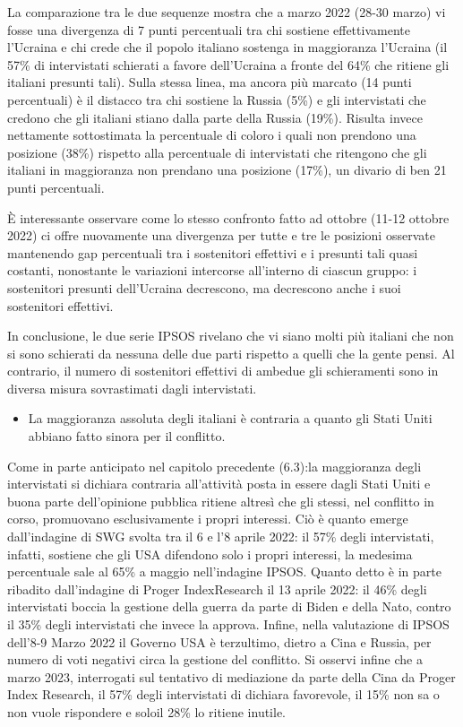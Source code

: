 \documentclass[
  openany]{book}
\providecommand{\tightlist}{%
  \setlength{\itemsep}{0pt}\setlength{\parskip}{0pt}}
\begin{document}
La comparazione tra le due sequenze mostra che a marzo 2022 (28-30 marzo) vi fosse una divergenza di 7 punti percentuali tra chi sostiene effettivamente l'Ucraina e chi crede che il popolo italiano sostenga in maggioranza l'Ucraina (il 57\% di intervistati schierati a favore dell'Ucraina a fronte del 64\% che ritiene gli italiani presunti tali). Sulla stessa linea, ma ancora più marcato (14 punti percentuali) è il distacco tra chi sostiene la Russia (5\%) e gli intervistati che credono che gli italiani stiano dalla parte della Russia (19\%). Risulta invece nettamente sottostimata la percentuale di coloro i quali non prendono una posizione (38\%) rispetto alla percentuale di intervistati che ritengono che gli italiani in maggioranza non prendano una posizione (17\%), un divario di ben 21 punti percentuali.

È interessante osservare come lo stesso confronto fatto ad ottobre (11-12 ottobre 2022) ci offre nuovamente una divergenza per tutte e tre le posizioni osservate mantenendo gap percentuali tra i sostenitori effettivi e i presunti tali quasi costanti, nonostante le variazioni intercorse all'interno di ciascun gruppo: i sostenitori presunti dell'Ucraina decrescono, ma decrescono anche i suoi sostenitori effettivi.

In conclusione, le due serie IPSOS rivelano che vi siano molti più italiani che non si sono schierati da nessuna delle due parti rispetto a quelli che la gente pensi. Al contrario, il numero di sostenitori effettivi di ambedue gli schieramenti sono in diversa misura sovrastimati dagli intervistati.

\begin{itemize}
\tightlist
\item
  La maggioranza assoluta degli italiani è contraria a quanto gli Stati Uniti abbiano fatto sinora per il conflitto.
\end{itemize}

Come in parte anticipato nel capitolo precedente (6.3):la maggioranza degli intervistati si dichiara contraria all'attività posta in essere dagli Stati Uniti e buona parte dell'opinione pubblica ritiene altresì che gli stessi, nel conflitto in corso, promuovano esclusivamente i propri interessi. Ciò è quanto emerge dall'indagine di SWG svolta tra il 6 e l'8 aprile 2022: il 57\% degli intervistati, infatti, sostiene che gli USA difendono solo i propri interessi, la medesima percentuale sale al 65\% a maggio nell'indagine IPSOS. Quanto detto è in parte ribadito dall'indagine di Proger IndexResearch il 13 aprile 2022: il 46\% degli intervistati boccia la gestione della guerra da parte di Biden e della Nato, contro il 35\% degli intervistati che invece la approva. Infine, nella valutazione di IPSOS dell'8-9 Marzo 2022 il Governo USA è terzultimo, dietro a Cina e Russia, per numero di voti negativi circa la gestione del conflitto. Si osservi infine che a marzo 2023, interrogati sul tentativo di mediazione da parte della Cina da Proger Index Research, il 57\% degli intervistati di dichiara favorevole, il 15\% non sa o non vuole rispondere e soloil 28\% lo ritiene inutile.
\end{document}
